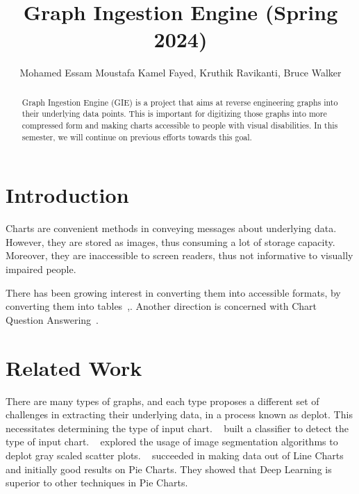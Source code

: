 \documentclass[
	letterpaper, %
]{jdf}
\author{Mohamed Essam Moustafa Kamel Fayed, Kruthik Ravikanti, Bruce Walker}
\title{Graph Ingestion Engine (Spring 2024)}
\begin{document}

\maketitle

\begin{abstract}

    Graph Ingestion Engine (GIE) is a project that aims at reverse engineering graphs into their underlying data points.
    This is important for digitizing those graphs into more compressed form and making charts accessible to people with visual disabilities.
    In this semester, we will continue on previous efforts towards this goal.
\end{abstract}

\section{Introduction}\label{sect:introduction}

Charts are convenient methods in conveying messages about underlying data.
However, they are stored as images, thus consuming a lot of storage capacity.
Moreover, they are inaccessible to screen readers, thus not informative to visually impaired people.

There has been growing interest in converting them into accessible formats, by converting them into tables~\cite{liu2022deplot},. 
Another direction is concerned with Chart Question Answering~\cite{masry2022chartqa,masry2024chartgemma}.


\section{Related Work}
\label{sect:related}
There are many types of graphs, and each type proposes a different set of challenges in extracting their underlying data, in a process known as deplot.
This necessitates determining the type of input chart.
~\cite{dsouza2023} built a classifier to detect the type of input chart.
~\cite{dsouza2022} explored the usage of image segmentation algorithms to deplot gray scaled scatter plots.
~\cite{dsouza2023} succeeded in making data out of Line Charts and initially good results on Pie Charts.
They showed that Deep Learning is superior to other techniques in Pie Charts.
\end{document}

